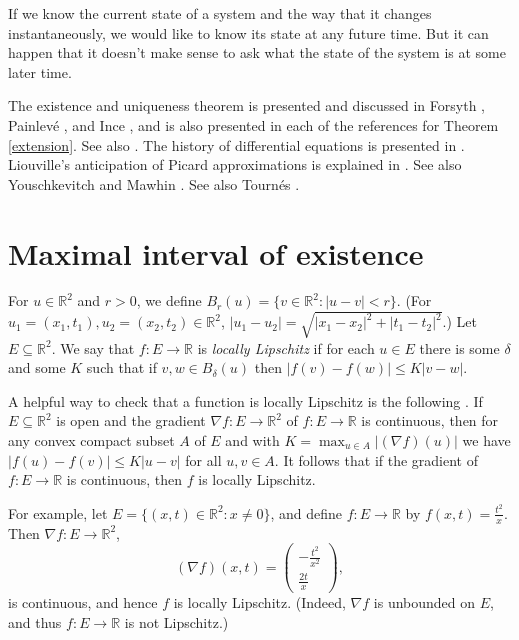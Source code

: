 \documentclass{article}
\begin{document}
If we know the current state of a system and the way that it changes instantaneously, we would like to know
its state at any future time. But it can happen that it doesn't make sense to ask what  the state of the system is at some later time. 


The existence and uniqueness theorem is presented and discussed in 
 Forsyth \cite[pp. 26--41, Chapter II]{forsyth}, Painlev\'e \cite{painleve}, and Ince \cite{ince}, and is also presented
in each of the references for Theorem \ref{extension}. See also \cite{roberts}. The history of differential equations is presented in \cite{archibald}. Liouville's
anticipation of Picard approximations is explained in \cite[p.~448, \S 32]{lutzen}.
See also Youschkevitch \cite{MR661918} and Mawhin \cite{mawhin}. See also Tourn\'es \cite{tournes}.


\section{Maximal interval of existence}
For $u \in \mathbb{R}^2$ and $r>0$, we define $B_r(u)=\{v \in \mathbb{R}^2: |u-v| < r\}$.
(For $u_1=(x_1,t_1), u_2=(x_2,t_2) \in \mathbb{R}^2$, $|u_1-u_2|=\sqrt{|x_1-x_2|^2+|t_1-t_2|^2}$.)
Let $E \subseteq \mathbb{R}^2$. We say that $f:E \to \mathbb{R}$ is {\em locally Lipschitz} if for each $u \in E$
there is some $\delta$ and some $K$  such that if $v,w \in B_\delta(u)$ then $|f(v)-f(w)| \leq K|v-w|$. 

A helpful way to check that a function is locally Lipschitz is the following \cite[p.~218, Theorem]{arnold}. If $E \subseteq \mathbb{R}^2$ is open
and the gradient $\nabla f:E \to \mathbb{R}^2$ of $f:E \to \mathbb{R}$ is continuous, then for
any convex compact subset $A$ of $E$ and  with $K=\max_{u \in A} |(\nabla f)(u)|$ we have
$|f(u)-f(v)| \leq K|u-v|$ for all $u,v \in A$. It follows that if the gradient of $f:E \to \mathbb{R}$ is continuous, then $f$ is locally Lipschitz.

For example, let $E=\{(x,t) \in \mathbb{R}^2: x \neq 0\}$, and define $f:E \to \mathbb{R}$ by $f(x,t)=\frac{t^2}{x}$. 
Then $\nabla f:E \to \mathbb{R}^2$,
\[
(\nabla f)(x,t)=\begin{pmatrix}-\frac{t^2}{x^2}\\ \frac{2t}{x} \end{pmatrix},
\]
is continuous, and hence $f$ is locally Lipschitz. (Indeed, $\nabla f$ is  unbounded on $E$, and thus $f:E \to \mathbb{R}$ is not Lipschitz.)
\end{document}
